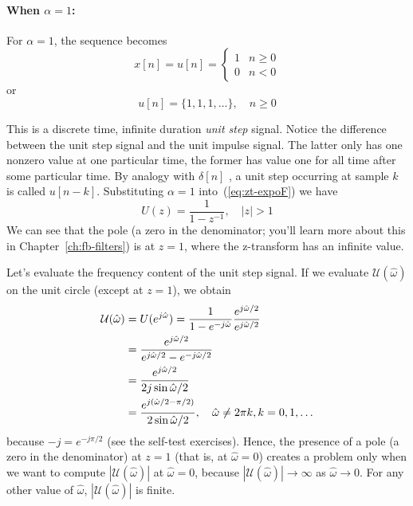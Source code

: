 \paragraph*{When $\alpha=1$:}

For $\alpha=1$, the sequence becomes
\begin{equation}
x[n] = u[n] = \left\{\begin{array}{ll}
                        1 & n \ge 0 \\
                        0 & n < 0
          \end{array}\right.
\end{equation}
or
\begin{equation}
u[n] = \{1, 1, 1, \ldots\}, \quad n \ge 0
\end{equation}

This is a discrete time, infinite duration \emph{unit step}
signal. Notice the difference between the unit step signal and the
unit impulse signal. The latter only has one nonzero value at one
particular time, the former has value one for all time after some
particular time. By analogy with $\delta[n]$ , a unit step occurring at
sample $k$ is called $u[n-k]$.  Substituting $\alpha=1$
into~(\ref{eq:zt-expoF}) we have
\begin{equation}
U(z)=\frac{1}{1-z^{-1}}, \quad |z|>1
\end{equation}
We can see that the pole (a zero in the denominator; you'll learn more
about this in Chapter~\ref{ch:fb-filters}) is at $z=1$, where the
z-transform has an infinite value.

Let's evaluate the frequency content of the unit step signal. If we
evaluate $\mathcal{U}(\hat{\omega})$ on the unit circle (except at
$z=1$), we obtain
\begin{align}
\mathcal{U}(\hat{\omega})
&= U(e^{j\hat{\omega}})
  =\frac{1}{1-e^{-j\hat{\omega}}}\frac{e^{j\hat{\omega}/2}}{e^{j\hat{\omega}/2}}
\notag\\
&= \frac{e^{j\hat{\omega}/2}}{e^{j\hat{\omega}/2}-e^{-j\hat{\omega}/2}} \notag\\
&= \frac{e^{j\hat{\omega}/2}}{2j\sin\hat{\omega}/2} \notag\\
&= \frac{e^{j(\hat{\omega}/2-\pi/2)}}{2\sin\hat{\omega}/2}, \quad \hat{\omega}\ne
2\pi k, k=0,1,\ldots
\end{align}
because $-j=e^{-j\pi/2}$ (see the self-test exercises).  Hence, the
presence of a pole (a zero in the denominator) at $z=1$ (that is, at
$\hat{\omega}=0$) creates a problem only when we want to compute
$|\mathcal{U}(\hat{\omega})|$ at $\hat{\omega}=0$, because
$|\mathcal{U}(\hat{\omega})|\rightarrow \infty$ as
$\hat{\omega}\rightarrow 0$. For any other value of $\hat{\omega}$,
$|\mathcal{U}(\hat{\omega})|$ is finite.

